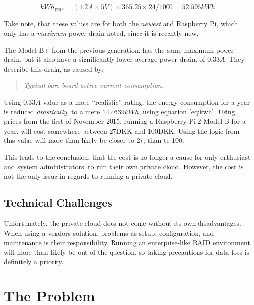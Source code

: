 			\begin{equation}
				kWh_{year} = (1.2A \times 5V ) \times 365.25 \times 24 / 1000 = 52.596kWh
				\label{eq:rpi_2_b_kwh}
			\end{equation}

			Take note, that these values are for both the \emph{newest} and Raspberry Pi, which only has a \emph{maximum} power drain noted, since it is recently new. 

			The Model B+ from the previous generation, has the same maximum power drain, but it also have a significantly lower average power drain, of $0.33A$. They describe this drain, as caused by:
			\begin{quote}
				\emph{Typical bare-board active current consumption.}\cite{raspberrypi_power}
			\end{quote}

			Using $0.33A$ value as a more ``realistic'' rating, the energy consumption for a year is reduced \emph{drastically}, to a mere $14.4639 kWh$, using equation \ref{eq:kwh}. Using prices from the first of November 2015\cite{dong_prices}, running a Raspberry Pi 2 Model B for a year, will cost somewhere between 27DKK and 100DKK. Using the logic from \cite{raspberrypi_power} this value will more than likely be closer to 27, than to 100.

			This leads to the conclusion, that the cost is no longer a cause for only enthusiast and system administrators, to run their own private cloud. However, the cost is not the only issue in regards to running a private cloud.


		\subsection*{Technical Challenges}
			Unfortunately, the private cloud does not come without its own disadvantages. When using a vendors solution, problems as setup, configuration, and maintenance is their responsibility. Running an enterprise-like RAID environment will more than likely be out of the question, so taking precautions for data loss is definitely a priority.







	\section{The Problem}









